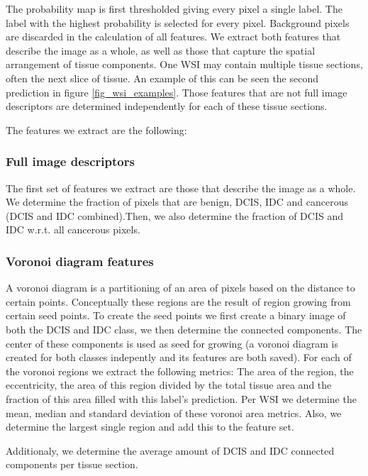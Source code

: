 \documentclass[journal]{IEEEtran}
\begin{document}
The probability map is first thresholded giving every pixel a single label. The label with the highest probability is selected for every pixel. Background pixels are discarded in the calculation of all features. 
We extract both features that describe the image as a whole, as well as those that capture the spatial arrangement of tissue components. One WSI may contain multiple tissue sections, often the next slice of tissue. An example of this can be seen the second prediction in figure \ref{fig_wsi_examples}. Those features that are not full image descriptors are determined independently for each of these tissue sections.


The features we extract are the following:

\subsubsection{Full image descriptors}
The first set of features we extract are those that describe the image as a whole. We determine the fraction of pixels that are benign, DCIS, IDC and cancerous (DCIS and IDC combined).Then, we also determine the fraction of DCIS and IDC w.r.t. all cancerous pixels.

\subsubsection{Voronoi diagram features}
A voronoi diagram is a partitioning of an area of pixels based on the distance to certain points. Conceptually these regions are the result of region growing from certain seed points. To create the seed points we first create a binary image of both the DCIS and IDC class, we then determine the connected components. The center of these components is used as seed for growing (a voronoi diagram is created for both classes indepently and its features are both saved). For each of the voronoi regions we extract the following metrics: The area of the region, the eccentricity, the area of this region divided by the total tissue area and the fraction of this area filled with this label's prediction. Per WSI we determine the mean, median and standard deviation of these voronoi area metrics. Also, we determine the largest single region and add this to the feature set.

Additionaly, we determine the average amount of DCIS and IDC connected components per tissue section.
\end{document}
